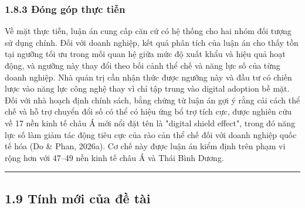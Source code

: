 \documentclass[12pt,a4paper]{article}
\begin{document}
\hypertarget{183-ux111uxf3ng-guxf3p-thux1ef1c-tiux1ec5n}{%
\subsubsection{1.8.3 Đóng góp thực
tiễn}\label{183-ux111uxf3ng-guxf3p-thux1ef1c-tiux1ec5n}}

Về mặt thực tiễn, luận án cung cấp căn cứ có hệ thống cho hai nhóm đối
tượng sử dụng chính. Đối với doanh nghiệp, kết quả phân tích của luận án
cho thấy tồn tại ngưỡng tối ưu trong mối quan hệ giữa mức độ xuất khẩu
và hiệu quả hoạt động, và ngưỡng này thay đổi theo bối cảnh thể chế và
năng lực số của từng doanh nghiệp. Nhà quản trị cần nhận thức được
ngưỡng này và đầu tư có chiến lược vào năng lực công nghệ thay vì chỉ
tập trung vào digital adoption bề mặt. Đối với nhà hoạch định chính
sách, bằng chứng từ luận án gợi ý rằng cải cách thể chế và hỗ trợ chuyển
đổi số có thể có hiệu ứng bổ trợ tích cực, được nghiên cứu về 17 nền
kinh tế châu Á mới nổi đặt tên là "digital shield effect", trong đó năng
lực số làm giảm tác động tiêu cực của rào cản thể chế đối với doanh
nghiệp quốc tế hóa (Do \& Phan, 2026a). Cơ chế này được luận án kiểm
định trên phạm vi rộng hơn với 47--49 nền kinh tế châu Á và Thái Bình
Dương.

\begin{center}\rule{0.5\linewidth}{0.5pt}\end{center}

\hypertarget{19-tuxednh-mux1edbi-cux1ee7a-ux111ux1ec1-tuxe0i}{%
\subsection{1.9 Tính mới của đề
tài}\label{19-tuxednh-mux1edbi-cux1ee7a-ux111ux1ec1-tuxe0i}}
\end{document}
